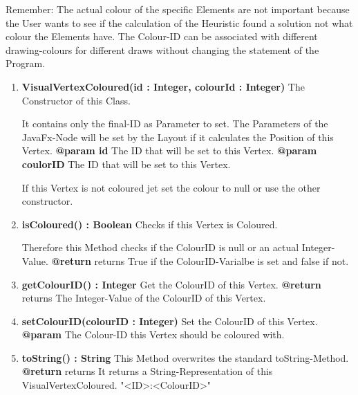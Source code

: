 \documentclass{article}
\begin{document}
\begin{enumerate}
{\begin{enumerate}[-]
{						Remember:
						The actual colour of the specific Elements are not important because the User wants to see if the calculation of the Heuristic found a solution not what colour the Elements have.
						The Colour-ID can be associated with different drawing-colours for different draws without changing the statement of the Program.
					}
				\end{enumerate}	
				\begin{enumerate}[+]
					\item{
						\textbf{VisualVertexColoured(id : Integer, colourId : Integer)} \newline
						The Constructor of this Class.
						
						It contains only the final-ID as Parameter to set.
						The Parameters of the JavaFx-Node will be set by the Layout if it calculates the Position of this Vertex.
						\newline
						\textbf{@param id}
							The ID that will be set to this Vertex.
							\newline
						\textbf{@param coulorID}
							The ID that will be set to this Vertex.
							
							If this Vertex is not coloured jet set the colour to null or use the other constructor.
							\newline
					}
					\item{
						\textbf{isColoured() : Boolean} \newline
						Checks if this Vertex is Coloured.
						
						Therefore this Method checks if the ColourID is null or an actual Integer-Value.
						\newline
						\textbf{@return} returns
							True if the ColourID-Varialbe is set and false if not.
							\newline
					}
					\item{
						\textbf{getColourID() : Integer} \newline
						Get the ColourID of this Vertex.
						\newline
						\textbf{@return} returns
							The Integer-Value of the ColourID of this Vertex.
							\newline
					}
					\item{
						\textbf{setColourID(colourID : Integer)} \newline
						Set the ColourID of this Vertex.
						\newline
						\textbf{@param}
							The Colour-ID this Vertex should be coloured with.
							\newline
					}
					\item{
						\textbf{toString() : String} \newline
						This Method overwrites the standard toString-Method.
						\newline
						\textbf{@return} returns
							It returns a String-Representation of this VisualVertexColoured.
							"<ID>:<ColourID>"
							\newline
					}
				\end{enumerate}	
			
}
\end{enumerate}
\end{document}
